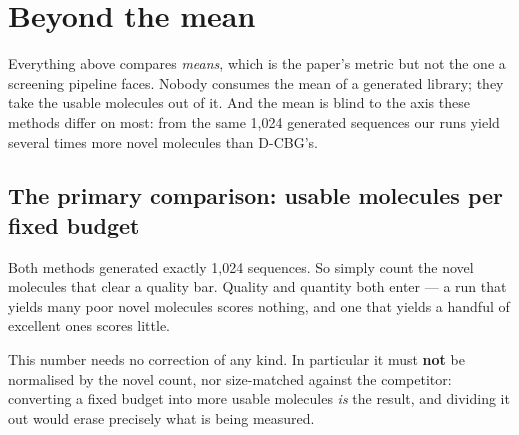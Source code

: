 \documentclass[11pt]{article}
\begin{document}
\begin{table}[htbp]
\centering
\small
{}
\caption{UDLM: the Pareto-optimal settings of each method on (novel count, novel-QED).}
\label{tab:frontier-qed-UDLM}
\end{table}

\section{Beyond the mean}\label{sec:beyond-mean-qed}

Everything above compares \emph{means}, which is the paper's metric but not the
one a screening pipeline faces. Nobody consumes the mean of a generated library;
they take the usable molecules out of it. And the mean is blind to the axis these
methods differ on most: from the same 1{,}024 generated sequences our runs yield
several times more novel molecules than D-CBG's.

\subsection{The primary comparison: usable molecules per fixed budget}

Both methods generated exactly 1{,}024 sequences. So simply count the novel
molecules that clear a quality bar. Quality and quantity both enter --- a run
that yields many poor novel molecules scores nothing, and one that yields a
handful of excellent ones scores little.

This number needs no correction of any kind. In particular it must \textbf{not}
be normalised by the novel count, nor size-matched against the competitor:
converting a fixed budget into more usable molecules \emph{is} the result, and
dividing it out would erase precisely what is being measured.
\end{document}

